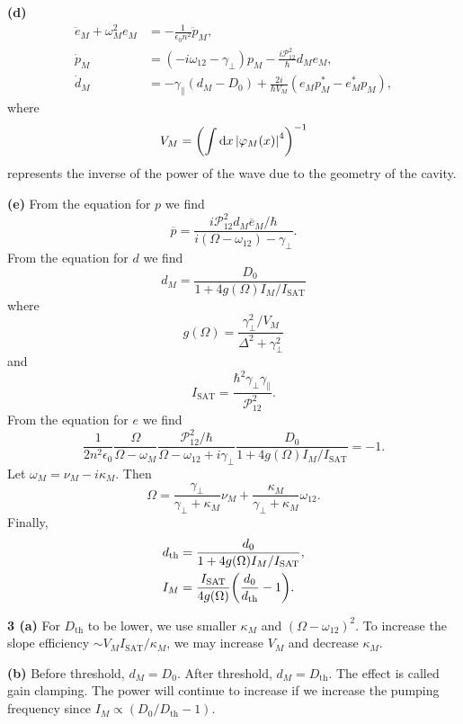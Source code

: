 \documentclass{article}
\makeatletter
\newcommand*{\shifttext}[1]{%
  \settowidth{\@tempdima}{#1}%
  \hspace{-\@tempdima}#1%
}
\newcommand{\plabel}[1]{%
\shifttext{\textbf{#1}\quad}%
}
\newcommand{\prule}{%
\begin{center}%
\hdashrule[0.5ex]{.99\linewidth}{1pt}{1pt 2.5pt}%
\end{center}%
}
\newcommand{\minusbaseline}{\abovedisplayskip=0pt\abovedisplayshortskip=0pt~\vspace*{-\baselineskip}}%
\makeatother
\begin{document}
\plabel{(d)}%
\begingroup\minusbaseline
\begin{align*}
    \ddot{e}_M + \omega_M^2 e_M &= -\frac{1}{\epsilon_0 n^2} \ddot{p}_M, \\
    \dot{p}_M &= (-i\omega_{12} - \gamma_\perp) p_M - \frac{i\mathcal{P}_{12}^2}{\hbar} d_M e_M, \\
    \dot{d}_M &= -\gamma_{\parallel} (d_M - D_0) + \frac{2i}{\hbar V_M}(e_M p_M^* - e_M^* p_M),
\end{align*}
\endgroup
where
\[ V_M = \qty(\int \dd{x} \abs{\varphi_M(x)}^4)^{-1} \]
represents the inverse of the power of the wave due to the geometry of the cavity.

\plabel{(e)}%
From the equation for $p$ we find
\[ \overline{p} = \frac{i\mathcal{P}_{12}^2 d_M \overline{e}_M/\hbar}{i(\Omega - \omega_{12}) - \gamma_\perp}. \]
From the equation for $d$ we find
\[ d_M = \frac{D_0}{1 + 4 g(\Omega) I_M / I_{\mathrm{SAT}}} \]
where
\[ g(\Omega) = \frac{\gamma_\perp^2 / V_M}{\Delta^2 + \gamma_\perp^2} \]
and
\[ I_{\mathrm{SAT}} = \frac{\hbar^2 \gamma_\perp \gamma_\parallel}{\mathcal{P}^2_{12}}. \]
From the equation for $e$ we find
\[ \frac{1}{2n^2 \epsilon_0} \frac{\Omega}{\Omega - \omega_M} \frac{\mathcal{P}_{12}^2 / \hbar}{\Omega - \omega_{12} + i\gamma_\perp} \frac{D_0}{1+4g(\Omega) I_M / I_{\mathrm{SAT}}} = -1. \]
Let $\omega_M = \nu_M - i\kappa_M$.
Then
\[ \Omega = \frac{\gamma_\perp}{\gamma_\perp + \kappa_M} \nu_M + \frac{\kappa_M}{\gamma_\perp + \kappa_M} \omega_{12}. \]
Finally,
\begin{align*}
    d_{\mathrm{th}} &= \frac{d_0}{1+4g(\Omega) I_M / I_{\mathrm{SAT}}}, \\
    I_M &= \frac{I_{\mathrm{SAT}}}{4g(\Omega)}\qty(\frac{d_0}{d_{\mathrm{th}}} - 1).
\end{align*}

\prule
\plabel{3 (a)}%
For $D_{\mathrm{th}}$ to be lower, we use smaller $\kappa_M$ and $(\Omega-\omega_{12})^2$.
To increase the slope efficiency $\sim V_M I_{\mathrm{SAT}}/\kappa_M$, we may increase $V_M$ and decrease $\kappa_M$.

\plabel{(b)}%
Before threshold, $d_M = D_0$.
After threshold, $d_M = D_{\mathrm{th}}$.
The effect is called gain clamping.
The power will continue to increase if we increase the pumping frequency since $I_M \propto (D_0/D_{\mathrm{th}} - 1)$.
\end{document}
